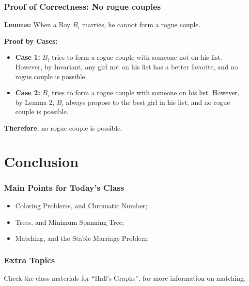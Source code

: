 \documentclass{beamer}
\begin{document}
\begin{frame}
  \frametitle{Proof of Correctness: No rogue couples}
  
  {\larger

    {\bf Lemma:} When a Boy $B_i$ marries, he cannot form a rogue
    couple.

    \bigskip

    {\bf Proof by Cases:}
    \begin{itemize}
    \item {\bf Case 1:} $B_i$ tries to form a rogue couple with
      someone not on his list. However, by \alert{Invariant}, any girl
      not on his list has a better favorite, and no rogue couple is
      possible.

    \item {\bf Case 2:} $B_i$ tries to form a rogue couple with
      someone on his list. However, by \alert{Lemma 2}, $B_i$ always
      propose to the best girl in his list, and no rogue couple is
      possible.
    \end{itemize}

    \bigskip

    {\bf Therefore}, no rogue couple is possible.
    
  }
\end{frame}

\section{Conclusion}
\begin{frame}
  \frametitle{Main Points for Today's Class}

  {\larger
    \begin{itemize}
    \item Coloring Problems, and Chromatic Number;

      \bigskip
      
    \item Trees, and Minimum Spanning Tree;

      \bigskip
      
    \item Matching, and the Stable Marriage Problem;
    \end{itemize}
  }
\end{frame}

\begin{frame}
  \frametitle{Extra Topics}

  {\larger

    Check the class materials for ``Hall's Graphs'', for more
    information on matching.
    
  }
  
\end{frame}
\end{document}
